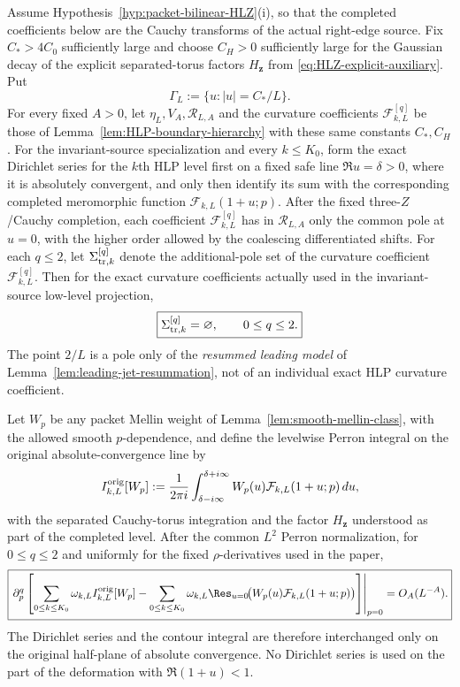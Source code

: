 \begin{lemma}
\label{lem:cluster-levelwise}
Assume Hypothesis~\ref{hyp:packet-bilinear-HLZ}(i), so that the completed
coefficients below are the Cauchy transforms of the actual right-edge source.
Fix $C_*>4C_0$ sufficiently large and choose $C_H>0$ sufficiently large for
the Gaussian decay of the explicit separated-torus factors
$H_{\mathbf z}$ from \eqref{eq:HLZ-explicit-auxiliary}. Put
\[
\Gamma_L:=\{u:|u|=C_*/L\}.
\]
For every fixed $A>0$, let $\eta_L,V_A,\mathscr R_{L,A}$ and the curvature
coefficients $\mathcal F_{k,L}^{[q]}$ be those of
Lemma~\ref{lem:HLP-boundary-hierarchy} with these same constants $C_*,C_H$.
For the invariant-source specialization and every $k\le K_0$, form the exact
Dirichlet series for the $k$th HLP level first on a fixed safe line
$\Re u=\delta>0$, where it is absolutely convergent, and only then identify its
sum with the corresponding completed meromorphic function
$\mathcal F_{k,L}(1+u;p)$.
After the fixed three-$Z$/Cauchy completion, each coefficient
$\mathcal F_{k,L}^{[q]}$ has in $\mathscr R_{L,A}$ only the common pole at
$u=0$, with the higher order allowed
by the coalescing differentiated shifts. For each $q\le2$, let $\Sigma_{{\rm tr},k}^{[q]}$ denote the additional-pole
set of the curvature coefficient $\mathcal F_{k,L}^{[q]}$.  Then for the exact
curvature coefficients actually used in the invariant-source low-level
projection,
\begin{equation}
\boxed{\Sigma_{{\rm tr},k}^{[q]}=\varnothing,
\qquad 0\le q\le2.}
\label{eq:no-exact-translated-poles}
\end{equation}
The point $2/L$ is a pole only of the \emph{resummed leading model} of
Lemma~\ref{lem:leading-jet-resummation}, not of an individual exact HLP
curvature coefficient.

Let $W_p$ be any packet Mellin weight of Lemma~\ref{lem:smooth-mellin-class},
with the allowed smooth $p$-dependence, and define the levelwise Perron integral
on the original absolute-convergence line by
\[
I_{k,L}^{\rm orig}[W_p]
:=\frac1{2\pi i}\int_{\delta-i\infty}^{\delta+i\infty}
W_p(u)\mathcal F_{k,L}(1+u;p)\,du,
\]
with the separated Cauchy-torus integration and the factor
$H_{\mathbf z}$ understood as part of the completed level.
After the common $L^2$ Perron normalization, for
$0\le q\le2$ and uniformly for the fixed $\rho$-derivatives used in the paper,
\begin{equation}
\boxed{
\left.\partial_p^q\left[
\sum_{0\le k\le K_0}\omega_{k,L}I_{k,L}^{\rm orig}[W_p]
-
\sum_{0\le k\le K_0}\omega_{k,L}
\Res_{u=0}\!\bigl(W_p(u)\mathcal F_{k,L}(1+u;p)\bigr)
\right]\right|_{p=0}
=O_A(L^{-A}).
}
\label{eq:levelwise-Perron-deformation}
\end{equation}
The Dirichlet series and the contour integral are therefore interchanged only
on the original half-plane of absolute convergence. No Dirichlet series is
used on the part of the deformation with $\Re(1+u)<1$.
\end{lemma}

